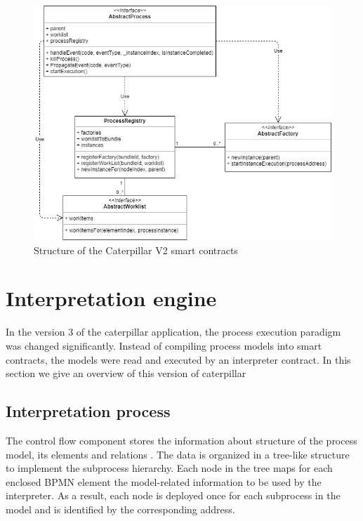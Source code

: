 \begin{figure}[hbt]
	\includegraphics[width=\textwidth]{gfx/caterpillar-compilation-contracts}
	\caption{Structure of the Caterpillar V2 smart contracts}
	\label{fig:caterpillar:v2:contracts}
\end{figure}

\section{Interpretation engine}
\label{sec:caterpillar:v3}

In the version 3 of the caterpillar application, the process execution paradigm was changed significantly. Instead of compiling process models into smart contracts, the models were read and executed by an interpreter contract. In this section we give an overview of this version of caterpillar

\subsection{Interpretation process}
\label{sec:caterpillar:v3:process}

The control flow component stores the information about structure of the process model, its elements and relations \cite{caterpillarv3}. The data is organized in a tree-like structure to implement the subprocess hierarchy. Each node in the tree maps for each enclosed BPMN element the model-related information to be used by the interpreter. As a result, each node is deployed once for each subprocess in the model and is identified by the corresponding address.


